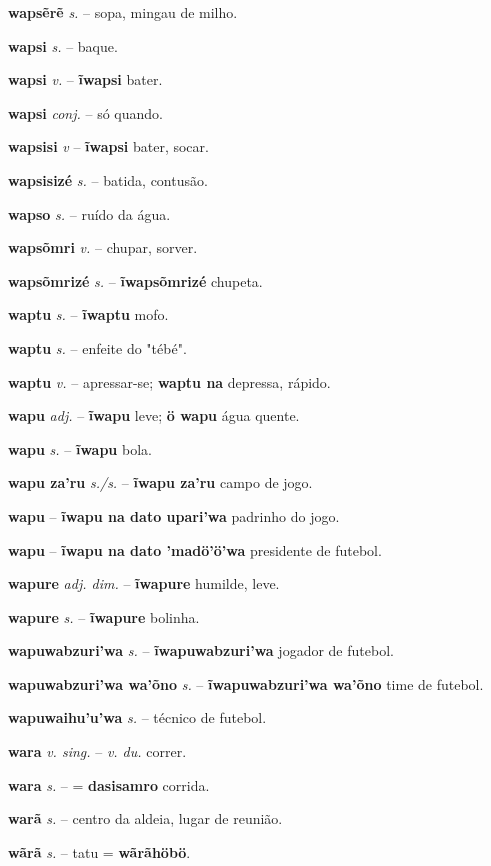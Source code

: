 \textbf{wapsẽrẽ} \textit{s.} -- sopa, mingau de milho.

\textbf{wapsi} \textit{s.} -- baque.

\textbf{wapsi} \textit{v.} -- \textbf{ĩwapsi} bater.

\textbf{wapsi} \textit{conj.} -- só quando.

\textbf{wapsisi} \textit{v} -- \textbf{ĩwapsi} bater, socar.

\textbf{wapsisizé} \textit{s.} -- batida, contusão.

\textbf{wapso} \textit{s.} -- ruído da água.

\textbf{wapsõmri} \textit{v.} -- chupar, sorver.

\textbf{wapsõmrizé} \textit{s.} -- \textbf{ĩwapsõmrizé} chupeta.

\textbf{waptu} \textit{s.} -- \textbf{ĩwaptu} mofo.

\textbf{waptu} \textit{s.} -- enfeite do "tébé".

\textbf{waptu} \textit{v.} -- apressar-se; \textbf{waptu na} depressa, rápido.

\textbf{wapu} \textit{adj.} -- \textbf{ĩwapu} leve; \textbf{ö wapu} água quente.

\textbf{wapu} \textit{s.} -- \textbf{ĩwapu} bola.

\textbf{wapu za'ru} \textit{s./s.} -- \textbf{ĩwapu za'ru} campo de jogo.

\textbf{wapu} \textit{} -- \textbf{ĩwapu na dato upari'wa} padrinho do jogo.

\textbf{wapu} \textit{} -- \textbf{ĩwapu na dato 'madö'ö'wa} presidente de futebol.

\textbf{wapure} \textit{adj. dim.} -- \textbf{ĩwapure} humilde, leve.

\textbf{wapure} \textit{s.} -- \textbf{ĩwapure} bolinha.

\textbf{wapuwabzuri'wa} \textit{s.} -- \textbf{ĩwapuwabzuri'wa} jogador de futebol.

\textbf{wapuwabzuri'wa wa'õno} \textit{s.} -- \textbf{ĩwapuwabzuri'wa wa'õno} time de futebol.

\textbf{wapuwaihu'u'wa} \textit{s.} -- técnico de futebol.

\textbf{wara} \textit{v. sing.} -- \textit{v. du.} correr.

\textbf{wara} \textit{s.} -- = \textbf{dasisamro} corrida.

\textbf{warã} \textit{s.} -- centro da aldeia, lugar de reunião.

\textbf{wãrã} \textit{s.} -- tatu = \textbf{wãrãhöbö}.

